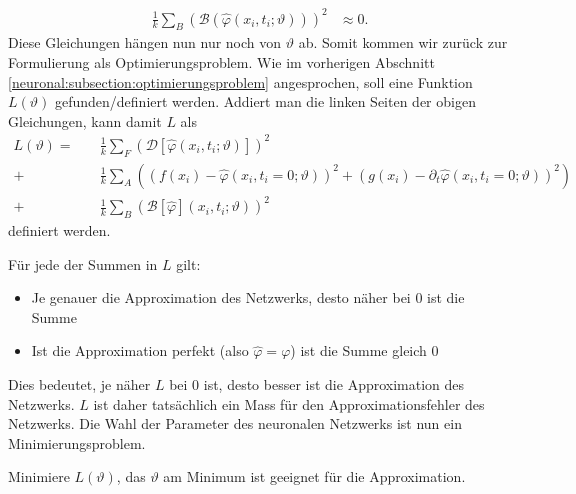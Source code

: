 \begin{equation}
    \begin{aligned}
        \frac{1}{k} \sum_{B}^{} \left(\mathcal{B}(\hat{\varphi}(x_i, t_i; \vartheta))\right)^2 &\approx 0.
    \end{aligned}
    \label{neuronal:randbedingung_umformuliert_netz_disk}
\end{equation}
Diese Gleichungen hängen nun nur noch von $\vartheta$ ab.
Somit kommen wir zurück zur Formulierung als Optimierungsproblem.
Wie im vorherigen Abschnitt \ref{neuronal:subsection:optimierungsproblem} angesprochen, soll eine Funktion $L(\vartheta)$ gefunden/definiert werden.
Addiert man die linken Seiten der obigen Gleichungen, kann damit \( L \) als
\begin{equation}
    \begin{aligned}
        L(\vartheta) =\quad &\frac{1}{k} \sum_{F}^{} \left(\mathcal{D}[\hat{\varphi}(x_i, t_i; \vartheta)]\right)^2\\
        + &\frac{1}{k} \sum_{A}^{} \left(\left(f(x_i) - \hat{\varphi}(x_i, t_i = 0; \vartheta)\right)^2
        + \left(g(x_i) - \partial_t \hat{\varphi}(x_i, t_i = 0; \vartheta)\right)^2\right)\\
        + &\frac{1}{k} \sum_{B}^{} \left(\mathcal{B}[\hat{\varphi}](x_i, t_i; \vartheta)\right)^2
    \end{aligned}
    \label{neuronal:optimierung}
\end{equation}
definiert werden.

Für jede der Summen in \( L \) gilt:
\begin{itemize}
    \item Je genauer die Approximation des Netzwerks, desto näher bei 0 ist die Summe
    \item Ist die Approximation perfekt (also \( \hat{\varphi} = \varphi \)) ist die Summe gleich 0
\end{itemize}
Dies bedeutet, je näher \( L \) bei 0 ist, desto besser ist die Approximation des Netzwerks.
$L$ ist daher tatsächlich ein Mass für den Approximationsfehler des Netzwerks.
Die Wahl der Parameter des neuronalen Netzwerks ist nun ein Minimierungsproblem.
\begin{aufgabe}
    Minimiere $L(\vartheta)$, das $\vartheta$ am Minimum ist geeignet für die Approximation.
\end{aufgabe}

